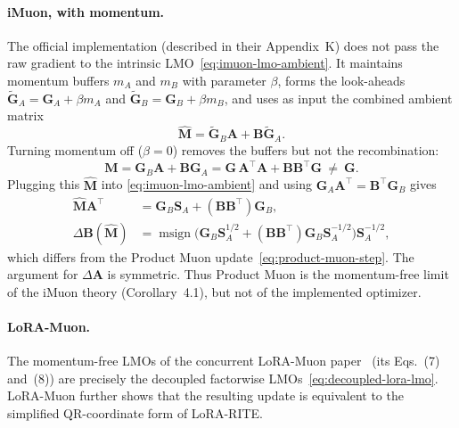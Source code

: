 \documentclass{article}
\newcommand{\mat}[1]{\bm{#1}}
\DeclareMathOperator{\msign}{msign}          %
\begin{document}
\paragraph{iMuon, with momentum.} The official implementation (described in their Appendix~K) does not pass the raw gradient to the intrinsic LMO~\eqref{eq:imuon-lmo-ambient}. It maintains momentum buffers $m_A$ and $m_B$ with parameter $\beta$, forms the look-aheads $\widetilde{\mat{G}}_A=\mat{G}_A+\beta m_A$ and $\widetilde{\mat{G}}_B=\mat{G}_B+\beta m_B$, and uses as input the combined ambient matrix
\begin{equation*}
  \widehat{\mat{M}}=\widetilde{\mat{G}}_B \mat{A}+\mat{B}\widetilde{\mat{G}}_A .
\end{equation*}
Turning momentum off ($\beta=0$) removes the buffers but not the recombination:
\begin{equation*}
  \widehat{\mat{M}}=\mat{G}_B \mat{A}+\mat{B} \mat{G}_A=\mat{G}\,\mat{A}^\top \mat{A}+\mat{B}\mat{B}^\top \mat{G}\ \neq\ \mat{G} .
\end{equation*}
Plugging this $\widehat{\mat{M}}$ into \eqref{eq:imuon-lmo-ambient} and using $\mat{G}_A \mat{A}^\top=\mat{B}^\top \mat{G}_B$ gives
\begin{equation}\label{eq:imuon-implemented}
\begin{aligned}
  \widehat{\mat{M}} \mat{A}^\top&=\mat{G}_B \mat{S}_A+(\mat{B}\mat{B}^\top)\mat{G}_B,\\
  \Delta\mat{B}(\widehat{\mat{M}})&=\msign\!\big(\mat{G}_B \mat{S}_A^{1/2}+(\mat{B}\mat{B}^\top)\mat{G}_B \mat{S}_A^{-1/2}\big)\mat{S}_A^{-1/2},
\end{aligned}
\end{equation}
which differs from the Product Muon update~\eqref{eq:product-muon-step}. The argument for $\Delta\mat{A}$ is symmetric. Thus Product Muon is the momentum-free limit of the iMuon theory (Corollary~4.1), but not of the implemented optimizer.


\paragraph{LoRA-Muon.}
The momentum-free LMOs of the concurrent LoRA-Muon paper~\cite{loramuon} (its Eqs.~(7) and~(8)) are precisely the decoupled factorwise LMOs~\eqref{eq:decoupled-lora-lmo}. LoRA-Muon further shows that the resulting update is equivalent to the simplified QR-coordinate form of LoRA-RITE.
\end{document}
